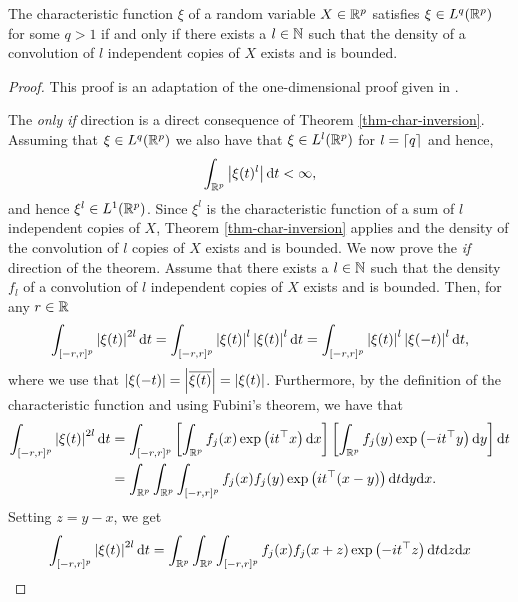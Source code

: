 \begin{lemma} \label{lem-char-integrable-convolution}
    The characteristic function $\xi$ of a random variable $X \in \Rp$ satisfies $\xi \in L^q(\Rp)$ for some $q > 1$ if and only if there exists a $l \in \N$ such that the density of a convolution of $l$ independent copies of $X$ exists and is bounded.
\end{lemma}
\begin{proof}
    This proof is an adaptation of the one-dimensional proof given in \cite[Lemma 2.4.4]{kolassa2006series}.

    The \textit{only if} direction is a direct consequence of Theorem \ref{thm-char-inversion}. Assuming that $\xi \in L^q(\Rp)$ we also have that $\xi \in L^l(\Rp)$ for $l = \ceil{q}$ and hence,
    \begin{equation*}
        \intRp{t}{\abs{\xi(t)^l}} < \infty,
    \end{equation*}
    and hence $\xi^l \in L^1(\Rp)$. Since $\xi^l$ is the characteristic function of a sum of $l$ independent copies of $X$, Theorem \ref{thm-char-inversion} applies and the density of the convolution of $l$ copies of $X$ exists and is bounded.
    \newline
    We now prove the \textit{if} direction of the theorem. Assume that there exists a $l \in \N$ such that the density $f_l$ of a convolution of $l$ independent copies of $X$ exists and is bounded. Then, for any $r \in \R$
    \begin{equation*}
        \int_{[-r, r]^p} \abs{\xi(t)}^{2l} \d t
        = \int_{[-r, r]^p} \abs{\xi(t)}^l\abs{\xi(t)}^l \d t
        = \int_{[-r, r]^p} \abs{\xi(t)}^l\abs{\xi(-t)}^l \d t,
    \end{equation*}
    where we use that $\abs{\xi(-t)} = \abs{\overline{\xi(t)}} = \abs{\xi(t)}$. Furthermore, by the definition of the characteristic function and using Fubini's theorem, we have that
    \begin{align*}
        \int_{[-r, r]^p} \abs{\xi(t)}^{2l} \d t
        &= \int_{[-r, r]^p} \left[\intRp{x}{f_j(x)\expf{it^\top x}}\right]\left[\intRp{y}{f_j(y)\expf{-it^\top y}}\right] \d t\\
        &= \intRp{x}{\intRp{y}{\int_{[-r, r]^p} f_j(x)f_j(y)\expf{it^\top (x - y)}\d t}}.
    \end{align*}
    Setting $z = y - x$, we get
    \begin{align*}
        \int_{[-r, r]^p} \abs{\xi(t)}^{2l} \d t
        &= \intRp{x}{\intRp{z}{\int_{[-r, r]^p} f_j(x)f_j(x + z)\expf{-it^\top z}\d t}}\\

\end{align*}
\end{proof}
